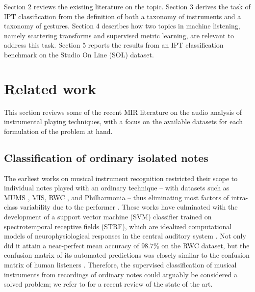 Section 2 reviews the existing literature on the topic.
Section 3 derives the task of IPT classification from the definition of both a taxonomy of instruments and a taxonomy of gestures.
Section 4 describes how two topics in machine listening, namely scattering transforms and supervised metric learning, are relevant to address this task.
Section 5 reports the results from an IPT classification benchmark on the Studio On Line (SOL) dataset.



\section{Related work}
This section reviews some of the recent MIR literature on the audio analysis of instrumental playing techniques,
with a focus on the available datasets for each formulation of the problem at hand.

\subsection{Classification of ordinary isolated notes}
The earliest works on musical instrument recognition restricted their scope to individual notes played with an ordinary technique -- with datasets such as MUMS \cite{opolko1989dataset}, MIS, RWC \cite{goto2003ismir}, and Philharmonia -- thus eliminating most factors of intra-class variability due to the performer  \cite{martin1998asa,brown1999jasa,eronen2000icassp,herrera2003jnmr,wieczorkowska2003jiis,kaminskyj2005jiis,benetos2006icassp}.
These works have culminated with the development of a support vector machine (SVM) classifier trained on spectrotemporal receptive fields (STRF), which are idealized computational models of neurophysiological responses in the central auditory system \cite{chi2005jasa}.
Not only did it attain a near-perfect mean accuracy of $98.7\%$ on the RWC dataset, but the confusion matrix of its automated predictions was closely similar to the confusion matrix of human listeners \cite{patil2012plos}.
Therefore, the supervised classification of musical instruments from recordings of ordinary notes could arguably be considered a solved problem; we refer to \cite{bhalke2016jiis} for a recent review of the state of the art.

